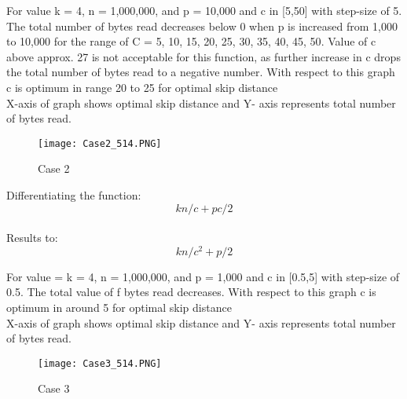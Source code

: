\documentclass[12pt]{report}
\begin{document}
For value  k = 4, n = 1,000,000, and p = 10,000 and c in [5,50] with step-size of 5. The total number of bytes read decreases below 0 when p is increased from 1,000 to 10,000 for the range of C = {5, 10, 15, 20, 25, 30, 35, 40, 45, 50}. Value of c above approx. 27 is not acceptable for this function, as further increase in c drops the total number of bytes read to a negative number. With respect to this graph c is optimum in range 20 to 25 for optimal skip distance\\

X-axis of graph shows optimal skip distance and Y- axis represents   total number of bytes read.
\begin{figure}[ht] 
  \centering
  \texttt{[image: Case2\_514.PNG]}
  \caption{Case 2}
  \label{fig:26}
\end{figure}

Differentiating the function: \[kn/c + pc/2\] \\

Results to: \[kn/c^2 + p/2\]

For value =   k = 4, n = 1,000,000, and p = 1,000 and c in [0.5,5] with step-size of 0.5. The total value of  f bytes read decreases.  With respect to this graph c is optimum in around 5 for optimal skip distance\\

X-axis of graph shows optimal skip distance and Y- axis represents   total number of bytes read.
\begin{figure}[ht] 
  \centering
  \texttt{[image: Case3\_514.PNG]}
  \caption{Case 3}
  \label{fig:27}
\end{figure}
\end{document}
